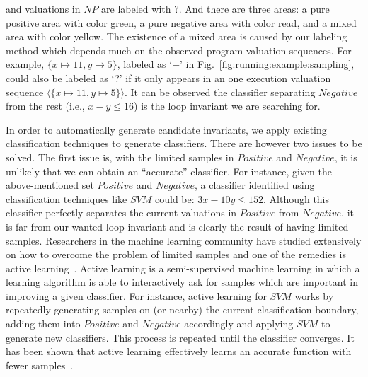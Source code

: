 and valuations in $\mathit{NP}$ are labeled with ?. %
And there are three areas: a pure positive area with color green, a pure negative area with color read, and a mixed area with color yellow.
The existence of a mixed area is caused by our labeling method which depends much on the observed program valuation sequences.
For example, $\mathit{\{x \mapsto 11, y \mapsto 5\}}$, labeled as `+' in Fig.~\ref{fig:running:example:sampling}, 
could also be labeled as `?' if it only appears in an one execution valuation sequence $\mathit{\langle \{x \mapsto 11, y \mapsto 5\} \rangle}$.
It can be observed the classifier separating $\mathit{Negative}$ from the rest (i.e., $\mathit{x - y \leq 16}$) 
is the loop invariant we are searching for. 

In order to automatically generate candidate invariants, we apply existing classification techniques to generate classifiers. 
There are however two issues to be solved. The first issue is, with the limited samples in $\mathit{Positive}$ and $\mathit{Negative}$, 
it is unlikely that we can obtain an ``accurate'' classifier. 
For instance, given the above-mentioned set $\mathit{Positive}$ and $\mathit{Negative}$, 
a classifier identified using classification techniques like $\mathit{SVM}$ could be: $\mathit{3x-10y \leq 152}$. %
Although this classifier perfectly separates the current valuations in $\mathit{Positive}$ from $\mathit{Negative}$. 
it is far from our wanted loop invariant and is clearly the result of having limited samples. 
Researchers in the machine learning community have studied extensively on how to overcome the problem of limited samples and one of the remedies is active learning~\cite{DBLP:series/synthesis/2012Settles}. 
Active learning is a semi-supervised machine learning in which a learning algorithm is able to interactively ask for samples which are important in improving a given classifier. 
For instance, active learning for $\mathit{SVM}$ works by repeatedly generating samples on (or nearby) the current classification boundary, adding them into $\mathit{Positive}$ and $\mathit{Negative}$ accordingly and applying $\mathit{SVM}$ to generate new classifiers. 
This process is repeated until the classifier converges. It has been shown that active learning effectively learns an accurate function with fewer samples~\cite{DBLP:conf/icml/SchohnC00}.

